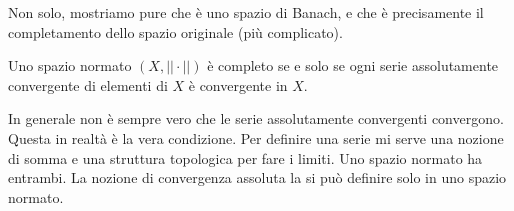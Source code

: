 \documentclass[a4paper]{article}
\begin{document}
\begin{radioactive}
Non solo, mostriamo pure che è uno spazio di Banach, e che è precisamente il completamento
dello spazio originale (più complicato).
\end{radioactive}

\begin{radioactive}
\begin{snippettheorem}{}
    Uno spazio normato \((X, ||\cdot||)\) è completo
    se e solo se ogni serie assolutamente convergente di elementi di \(X\)
    è convergente in \(X\).
\end{snippettheorem}
\end{radioactive}

\begin{radioactive}
In generale non è sempre vero che le serie assolutamente convergenti convergono.
Questa in realtà è la vera condizione.
Per definire una serie mi serve una nozione di somma e una struttura topologica per fare i limiti.
Uno spazio normato ha entrambi. La nozione di convergenza assoluta la si può definire solo in uno spazio normato.
\end{radioactive}
\end{document}
